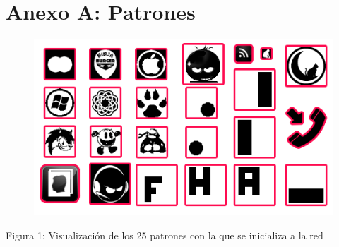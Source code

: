 \documentclass[%
    final,
    reprint,
    notitlepage,
    narroweqnarray,
    inline,
    twoside,
    invited
    ]{ieee}
\begin{document}
\clearpage
\onecolumn

\section*{Anexo A: Patrones}

\begin{figure}[H]
\begin{center}
\includegraphics[scale=0.70]{./images/patterns.png}
\label{modelado}
\end{center}
\end{figure}

\begin{center}
\par Figura 1: Visualización de los 25 patrones con la que se inicializa a la red
\end{center}



\end{document}
